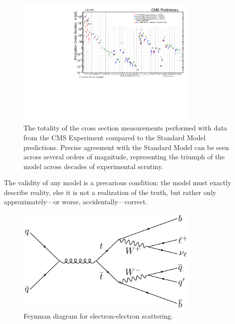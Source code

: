 \begin{figure}[htb]
    \centering
    \includegraphics[width=0.8\textwidth]{fig/cms/cms_xsecs_2021.pdf}
    \caption{
        The totality of the cross section measurements performed with data from the CMS Experiment compared to the Standard Model predictions. 
        Precise agreement with the Standard Model can be seen across several orders of magnitude, representing the triumph of the model across decades of experimental scrutiny.
    }
    \label{fig:cms_xsecs}
\end{figure}

The validity of any model is a precarious condition: the model must exactly describe reality, else it is not a realization of the truth, but rather only approximately---or worse, accidentally---correct. 

\begin{figure}[htb]
    \centering
    \includegraphics[width=0.8\textwidth]{fig/feynman/ttbar/ttbar_onelep.pdf} %
    \caption{
        Feynman diagram for electron-electron scattering. 
    }
    \label{fig:ee_scattering}
\end{figure}

